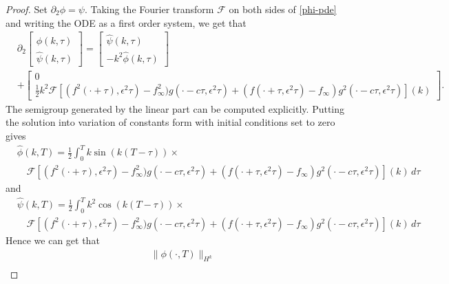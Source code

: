 \begin{proof}
	Set \(\partial_2 \phi = \psi\). Taking the Fourier transform \(\mathcal F\) on both sides of \cref{phi-pde} and writing the ODE as a first order system, we get that 
	\begin{equation}
	\begin{aligned}
		&\partial_2 \begin{bmatrix} \hat \phi(k,\tau) \\ \hat \psi(k,\tau) \end{bmatrix} = \begin{bmatrix}\hat \psi(k,\tau) \\ -k^2 \hat\phi(k,\tau) \end{bmatrix} \\ &+ \begin{bmatrix}
			0 \\   \frac 1 2 k^2 \mathcal F[ (f^2(\cdot+\tau),\epsilon^2\tau)-f_\infty^2)g(\cdot-c\tau,\epsilon^2\tau) +(f(\cdot+\tau,\epsilon^2\tau)-f_\infty)g^2(\cdot-c\tau,\epsilon^2\tau)](k)
		\end{bmatrix}.
	\end{aligned}
	\end{equation}
	The semigroup generated by the linear part can be computed explicitly. Putting the solution into variation of constants form with initial conditions set to zero gives
	\begin{equation}
	\begin{aligned}
		&\hat  \phi(k,T) = \frac 1 2 \int_0^Tk\sin(k(T-\tau)) \times\\
		&\quad\mathcal F[ (f^2(\cdot+\tau),\epsilon^2\tau)-f_\infty^2)g(\cdot-c\tau,\epsilon^2\tau) +(f(\cdot+\tau,\epsilon^2\tau)-f_\infty)g^2(\cdot-c\tau,\epsilon^2\tau)](k)\, d\tau
	\end{aligned}
	\end{equation}
	and 
	\begin{equation}\label{psi-fourier-transform}
	\begin{aligned}
		&\hat  \psi(k,T) = \frac 1 2 \int_0^Tk^2\cos(k(T-\tau)) \times\\
		&\quad\mathcal F[ (f^2(\cdot+\tau),\epsilon^2\tau)-f_\infty^2)g(\cdot-c\tau,\epsilon^2\tau) +(f(\cdot+\tau,\epsilon^2\tau)-f_\infty)g^2(\cdot-c\tau,\epsilon^2\tau)](k)\, d\tau
	\end{aligned}
	\end{equation}
	Hence we can get that 
	\begin{align*}
		&\|\phi(\cdot, T) \|_{H^k} \\

\end{align*}
\end{proof}
